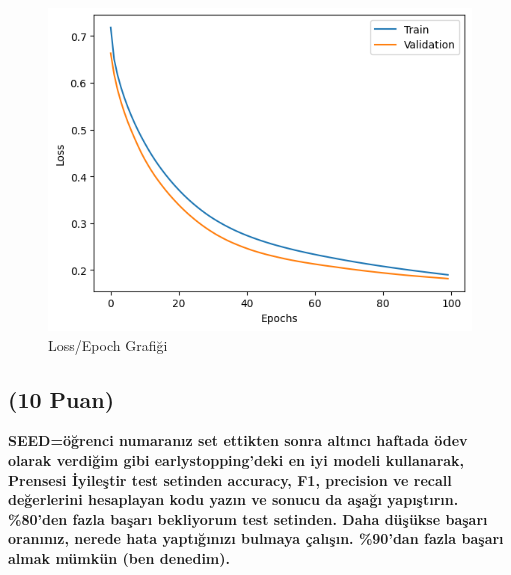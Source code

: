 \documentclass[11pt]{article}
\begin{document}
\begin{figure}[ht!]
    \centering
    \includegraphics{LossEpochGraph.png}
    \caption{Loss/Epoch Grafiği}
    \label{fig:my_label}
\end{figure}

\newpage
\subsection{(10 Puan)} \textbf{SEED=öğrenci numaranız set ettikten sonra altıncı haftada ödev olarak verdiğim gibi earlystopping'deki en iyi modeli kullanarak, Prensesi İyileştir test setinden accuracy, F1, precision ve recall değerlerini hesaplayan kodu yazın ve sonucu da aşağı yapıştırın. \%80'den fazla başarı bekliyorum test setinden. Daha düşükse başarı oranınız, nerede hata yaptığınızı bulmaya çalışın. \%90'dan fazla başarı almak mümkün (ben denedim).}
\end{document}
